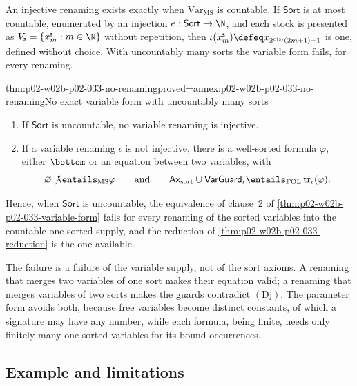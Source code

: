 An injective renaming exists exactly when \(\mathrm{Var}_{\mathrm{MS}}\) is
countable.  If \(\mathsf{Sort}\) is at most countable, enumerated by an
injection \(e:\mathsf{Sort}\to\N\), and each stock is presented as
\(V_{\mathsf s}=\{x^{\mathsf s}_m:m\in\N\}\) without repetition, then
\(\iota(x^{\mathsf s}_m)\defeq x_{2^{e(\mathsf s)}(2m+1)-1}\) is one, defined
without choice.  With uncountably many sorts the variable form fails, for
every renaming.

\begin{hbtheorem}{thm:p02-w02b-p02-033-no-renaming}{proved=annex:p02-w02b-p02-033-no-renaming}{No exact variable form with uncountably many sorts}
\begin{enumerate}
\item If \(\mathsf{Sort}\) is uncountable, no variable renaming is
      injective.
\item If a variable renaming \(\iota\) is not injective, there is a
      well-sorted formula \(\varphi\), either \(\bottom\) or an equation
      between two variables, with
      \[
       \varnothing\not\entails_{\mathrm{MS}}\varphi
       \qquad\text{and}\qquad
       \mathsf{Ax}_{\mathrm{sort}}\cup\mathsf{VarGuard}_{\iota}
       \entails_{\mathrm{FOL}}\operatorname{tr}_{\iota}(\varphi).
      \]
\end{enumerate}
Hence, when \(\mathsf{Sort}\) is uncountable, the equivalence of clause~2 of
\cref{thm:p02-w02b-p02-033-variable-form} fails for every renaming of the
sorted variables into the countable one-sorted supply, and the reduction of
\cref{thm:p02-w02b-p02-033-reduction} is the one available.
\end{hbtheorem}

The failure is a failure of the variable supply, not of the sort axioms.  A
renaming that merges two variables of one sort makes their equation valid; a
renaming that merges variables of two sorts makes the guards contradict
\((\mathrm{Dj})\).  The parameter form avoids both, because free variables
become distinct constants, of which a signature may have any number, while
each formula, being finite, needs only finitely many one-sorted variables for
its bound occurrences.

\subsection{Example and limitations}
\label{sec:p02-w02b-p02-033-example}

